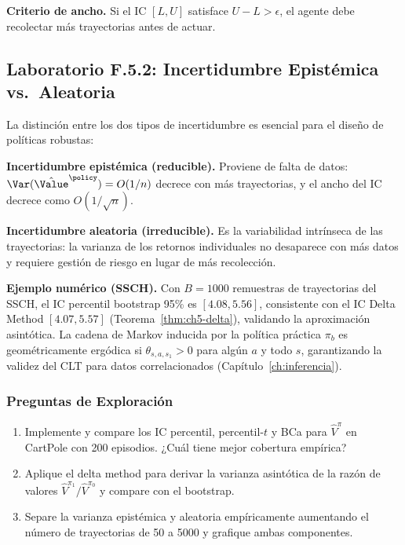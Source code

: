 \textbf{Criterio de ancho.} Si el IC $[L,U]$ satisface $U-L > \epsilon$,
el agente debe recolectar más trayectorias antes de actuar.

\subsection*{Laboratorio F.5.2: Incertidumbre Epistémica vs.\ Aleatoria}

La distinción entre los dos tipos de incertidumbre es esencial para el
diseño de políticas robustas:

\textbf{Incertidumbre epistémica (reducible).} Proviene de falta de datos:
$\Var(\hat{\Value}^\policy) = O(1/n)$ decrece con más trayectorias, y el
ancho del IC decrece como $O(1/\sqrt{n})$.

\textbf{Incertidumbre aleatoria (irreducible).} Es la variabilidad intrínseca
de las trayectorias: la varianza de los retornos individuales no desaparece
con más datos y requiere gestión de riesgo en lugar de más recolección.

\textbf{Ejemplo numérico (SSCH).}
\label{ex:ssch-cap05}
Con $B=1000$ remuestras de trayectorias del SSCH, el IC percentil bootstrap
95\% es $[4.08, 5.56]$, consistente con el IC Delta Method $[4.07, 5.57]$
(Teorema~\ref{thm:ch5-delta}), validando la aproximación asintótica.
La cadena de Markov inducida por la política práctica $\pi_b$ es
geométricamente ergódica si $\theta_{s,a,s_1}>0$ para algún $a$ y todo $s$,
garantizando la validez del CLT para datos correlacionados
(Capítulo~\ref{ch:inferencia}).

\subsubsection*{Preguntas de Exploración}

\begin{enumerate}
    \item Implemente y compare los IC percentil, percentil-$t$ y BCa para
          $\hat{V}^\pi$ en CartPole con 200 episodios. ¿Cuál tiene mejor
          cobertura empírica?
    \item Aplique el delta method para derivar la varianza asintótica de
          la razón de valores $\hat{V}^{\pi_1}/\hat{V}^{\pi_0}$ y compare
          con el bootstrap.
    \item Separe la varianza epistémica y aleatoria empíricamente aumentando
          el número de trayectorias de 50 a 5000 y grafique ambas componentes.
\end{enumerate}

